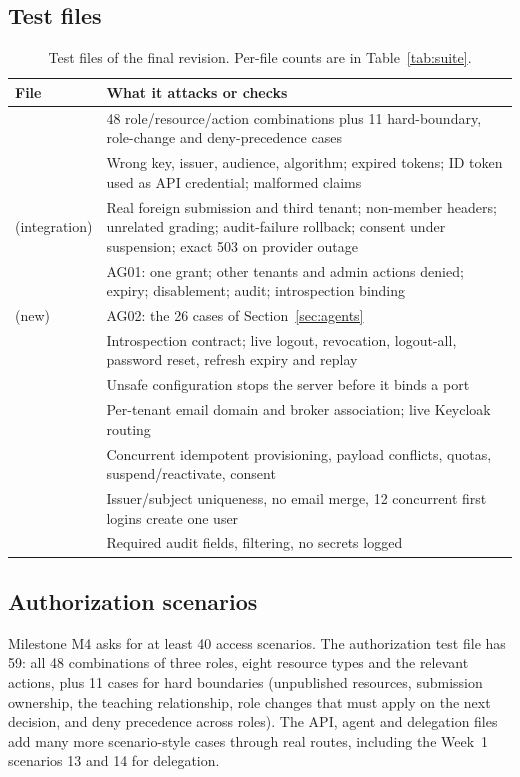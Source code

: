 \subsection{Test files}
\begin{table}[H]
\centering
\small
\begin{tabularx}{\textwidth}{@{}P{5.1cm} L@{}}
\toprule
\textbf{File} & \textbf{What it attacks or checks}\\
\midrule
{} & 48 role/resource/action combinations plus 11 hard-boundary, role-change and deny-precedence cases\\
 & Wrong key, issuer, audience, algorithm; expired tokens; ID token used as API credential; malformed claims\\
 (integration) & Real foreign submission and third tenant; non-member headers; unrelated grading; audit-failure rollback; consent under suspension; exact 503 on provider outage\\
 & AG01: one grant; other tenants and admin actions denied; expiry; disablement; audit; introspection binding\\
 (new) & AG02: the 26 cases of Section~\ref{sec:agents}\\
 & Introspection contract; live logout, revocation, logout-all, password reset, refresh expiry and replay\\
 & Unsafe configuration stops the server before it binds a port\\
 & Per-tenant email domain and broker association; live Keycloak routing\\
 & Concurrent idempotent provisioning, payload conflicts, quotas, suspend/reactivate, consent\\
 & Issuer/subject uniqueness, no email merge, 12 concurrent first logins create one user\\
 & Required audit fields, filtering, no secrets logged\\
\bottomrule
\end{tabularx}
\caption{Test files of the final revision. Per-file counts are in Table~\ref{tab:suite}.}
\end{table}

\subsection{Authorization scenarios}
Milestone M4 asks for at least 40 access scenarios. The authorization test file has 59: all 48 combinations of three roles, eight resource types and the relevant actions, plus 11 cases for hard boundaries (unpublished resources, submission ownership, the teaching relationship, role changes that must apply on the next decision, and deny precedence across roles). The API, agent and delegation files add many more scenario-style cases through real routes, including the Week~1 scenarios 13 and 14 for delegation.

